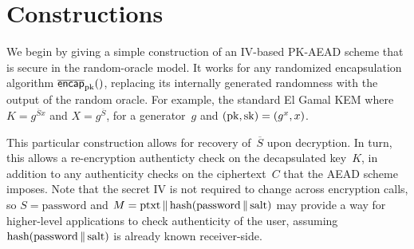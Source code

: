 \section{Constructions}
\label{sec:constructions}
We begin by giving a simple construction of an IV-based PK-AEAD scheme that is secure in the random-oracle model. It works for any randomized encapsulation algorithm $\OLencapprim{\pk}{}$, replacing its internally generated randomness with the output of the random oracle.  For example, the standard El Gamal KEM where $K=g^{\overline{S}x}$ and $X=g^{\overline{S}}$, for a generator~$g$ and $(\mathrm{pk},\mathrm{sk})=(g^x,x)$.

This particular construction allows for recovery of~$\overline{S}$ upon decryption.  In turn, this allows a re-encryption authenticty check on the decapsulated key~$K$, in addition to any authenticity checks on the ciphertext~$C$ that the AEAD scheme imposes.    
Note that the secret IV is not required to change across encryption calls, so $S=\mbox{password}$ and $M=\mbox{ptxt}\,\|\, \mbox{hash}(\mbox{password}\,\|\,\mbox{salt})$ may provide a way for higher-level applications to check authenticity of the user, assuming $\mbox{hash}(\mbox{password}\,\|\,\mbox{salt})$ is already known receiver-side.



